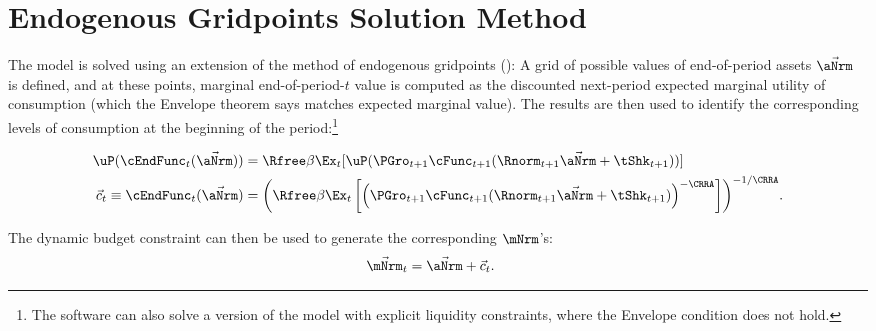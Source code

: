 \documentclass[\econtexRoot/BufferStockTheory]{subfiles}
\begin{document}
\section{Endogenous Gridpoints Solution Method}\label{sec:ApndxSolnMethEndogGpts}

The model is solved using an extension of the method of endogenous gridpoints (\cite{carrollEGM}): A grid of possible values of end-of-period assets $\vec{\aNrm}$ is defined, and at these points, marginal end-of-period-$t$ value is computed as the discounted next-period expected marginal utility of consumption (which the Envelope theorem says matches expected marginal value).  The results are then used to identify the corresponding levels of consumption at the beginning of the period:\footnote{The software can also solve a version of the model with explicit liquidity constraints, where the Envelope condition does not hold.}

\begin{equation}\begin{gathered}\begin{aligned}
  \uP(\cEndFunc_{t}(\vec{\aNrm}))  & = \Rfree \beta \Ex_{t}[ \uP(\PGro_{t+1}
  \cFunc_{t+1}(\Rnorm_{t+1}\vec{\aNrm} + \tShk_{t+1}))] \label{eq:cEulerEndog}
\\ \vec{c}_{t} \equiv \cEndFunc_{t}(\vec{\aNrm})  & = {\left(\Rfree \beta \Ex_{t}\left[ {\left(\PGro_{t+1}
      \cFunc_{t+1}(\Rnorm_{t+1}\vec{\aNrm} +
      \tShk_{t+1})\right)}^{-\CRRA}\right]\right)}^{-1/\CRRA}. \notag
\end{aligned}\end{gathered}\end{equation}

The dynamic budget constraint can then be used to generate the corresponding $\mNrm$'s:
\begin{eqnarray*}
  \vec{\mNrm}_{t}  & = \vec{\aNrm}+\vec{c}_{t}.
\end{eqnarray*}
\end{document}
